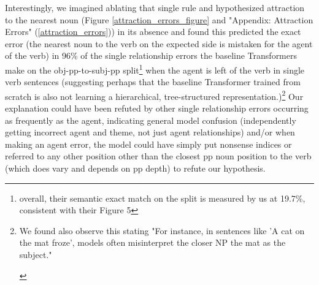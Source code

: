 \documentclass[11pt]{article}
\begin{document}
Interestingly, we imagined ablating that single rule and hypothesized attraction to the nearest noun (Figure \ref{attraction_errors_figure} and "Appendix: Attraction Errors" (\ref{attraction_errors})) in its absence and found this predicted the exact error (the nearest noun to the verb on the expected side is mistaken for the agent of the verb) 
in 96\% of the single relationship errors the \cite{Wu2023} baseline Transformers make on the obj-pp-to-subj-pp split\footnote{overall, their semantic exact match on the split is measured by us at 19.7\%, consistent with their Figure 5} when the agent is left of the verb in single verb sentences
(suggesting perhaps that the baseline \cite{Wu2023} Transformer trained from scratch is also not learning a hierarchical, tree-structured representation.)\footnote{\begin{footnotesize}We found \cite{li2023slogstructuralgeneralizationbenchmark} also observe this stating "For instance, in sentences like 'A cat on the mat froze', models often misinterpret the closer NP the mat as the subject."\end{footnotesize}}
Our explanation could have been refuted by other single relationship errors occurring as frequently as the agent, indicating general model confusion (independently getting incorrect agent and theme, not just agent relationships) and/or when making an agent error, the model could have simply put nonsense indices or referred to any other position other than the closest pp noun position to the verb (which does vary and depends on pp depth) to refute our hypothesis.
\end{document}
